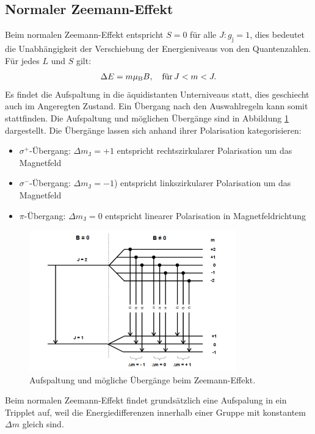 \subsection{Normaler Zeemann-Effekt}
Beim normalen Zeemann-Effekt entspricht $S=0$ für alle $J:g_\mathrm{j}=1$,
dies bedeutet die Unabhängigkeit der Verschiebung der Energieniveaus von den Quantenzahlen.
Für jedes $L$ und $S$ gilt:
\begin{align}
  \Delta E=m\mu_\mathrm{B}B ,\,\,\,\,\ \text{für}\,\-J < m < J. \label{eqn:landean}
\end{align}
Es findet die Aufspaltung in die äquidistanten Unterniveaus statt, dies geschiecht auch im Angeregten Zustand.
Ein Übergang nach den Auswahlregeln kann somit stattfinden.
Die Aufspaltung und möglichen Übergänge sind in Abbildung \ref{fig:normal} dargestellt.
Die Übergänge lassen sich anhand ihrer Polarisation kategorisieren:
\begin{itemize}
  \item{$\sigma^+$-Übergang: $\Delta m_\mathrm{J}=+1$  entspricht rechtszirkularer Polarisation um das Magnetfeld}
  \item{$\sigma^-$-Übergang: $\Delta m_\mathrm{J}=-1$) entspricht linkszirkularer Polarisation um das Magnetfeld }
  \item{$\pi$-Übergang: $\Delta m_\mathrm{J}=0$ entspricht linearer Polarisation in Magnetfeldrichtung}
\end{itemize}
\begin{figure}
   \centering
    \includegraphics[width=0.8\textwidth]{normal.PNG}
    \caption{Aufspaltung und mögliche Übergänge beim Zeemann-Effekt.\cite{skript}}
    \label{fig:normal}
\end{figure}
Beim normalen Zeemann-Effekt findet grundsätzlich eine Aufspalung in ein Tripplet auf, weil die Energiedifferenzen
innerhalb einer Gruppe mit konstantem $\Delta m$ gleich sind.

